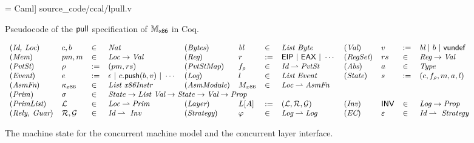 \begin{figure}[t]
 = Caml] {source_code/ccal/lpull.v}
\caption{Pseudocode of the $\mathsf{pull}$ specification of $\mathbb{M}_{\mathsf{x86}}$  in Coq.}
\label{fig:exp:lpull}
\end{figure}

\begin{figure*}
\begin{center}
$
{\small
\begin{array}{llllllllllll}
(\textit{Id, Loc}) & c, b & \in &\textit{Nat}
& 
(\textit{Bytes})  &\bytelist & \in & \textit{List Byte}
&
(\textit{Val}) & v & := & \bytelist \ | \ b \ |\ \vundef
\\
 (\textit{Mem}) & pm, m & \in & \textit{Loc} \rightarrow  \textit{Val} 
&
(\textit{Reg})  &r & := & \mathsf{EIP} \ | \ \mathsf{EAX} \ | \  \cdots
& 
(\textit{RegSet}) & \regset & \in & \textit{Reg} \rightarrow \textit{Val}  
\\
(\textit{PvtSt}) & \regs & := & (pm, rs)
& 
(\textit{PvtStMap}) & f_\regs &\in & \textit{Id} \alist \textit{PvtSt}  
&
(\textit{Abs}) & a & \in & \textit{Type}  
\\ 
(\textit{Event}) & e & := & \emptye \ | \ c.\push(b,v)
\ |\  \cdots
&
(\textit{Log}) & l & \in & \textit{List}\ \textit{Event}
& 
(\textit{State}) & s & := & (c, f_\regs,m,a,l)
\\
(\textit{AsmFn}) & \kappa_{x86} & \in &  \textit{List x86Instr}  
&
(\textit{AsmModule}) & M_{x86} & \in & \textit{Loc} \partialf  \textit{AsmFn} 
 \\
(\mathit{Prim}) & \spec{} & \in & 
\multicolumn{5}{l}{
\mathit{State} \rightarrow
\textit{List Val} \rightarrow 
\mathit{State}  \rightarrow
\textit{Val} \rightarrow 
\textit{Prop}}
 \\
(\textit{PrimList}) & \Layer & \in & \textit{Loc} \alist \textit{Prim}
&
(\textit{Layer}) & L[A] & := & (\Layer, \Rely, \Guard)
 &
 (\textit{Inv}) & \comm{INV} & \in & \textit{Log} \rightarrow \textit{Prop}
\\
(\textit{Rely, Guar}) & \Rely, \Guard& \in & \textit{Id} \alist\ \textit{Inv}
&
(\textit{Strategy}) & \strat{} & \in & \textit{Log} \alist \textit{Log}
&
(\textit{EC}) & \oracle & \in & \textit{Id} \alist\ \textit{Strategy}
\end{array}
}
$
\end{center}
\caption{The machine state for the concurrent machine model and the concurrent layer interface.}
\label{fig:mach:syntax}
\end{figure*}

